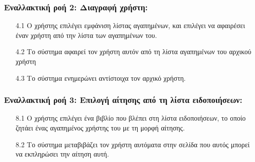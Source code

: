 \documentclass[12pt,a4paper]{article}
\begin{document}
\subsubsection*{Εναλλακτική ροή 2: Διαγραφή χρήστη:}
\begin{enumerate}
    \item [4.1] Ο χρήστης επιλέγει εμφάνιση λίστας αγαπημένων, και επιλέγει να αφαιρέσει έναν χρήστη από την λίστα των αγαπημένων του.
    \item [4.2] Το σύστημα αφαιρεί τον χρήστη αυτόν από τη λίστα αγαπημένων του αρχικού χρήστη
    \item [4.3] Το σύστημα ενημερώνει αντίστοιχα τον αρχικό χρήστη.
\end{enumerate}

\subsubsection*{Εναλλακτική ροή 3: Επιλογή αίτησης από τη λίστα ειδοποιήσεων:}
\begin{enumerate}
    \item [8.1] Ο χρήστης επιλέγει ένα βιβλίο που βλέπει στη λίστα ειδοποιήσεων, το οποίο ζητάει ένας αγαπημένος χρήστης του με τη μορφή αίτησης.
    \item [8.2] Το σύστημα μεταβιβάζει τον χρήστη αυτόματα στην σελίδα που αυτός μπορεί να εκπληρώσει την αίτηση αυτή.
\end{enumerate}
\end{document}
